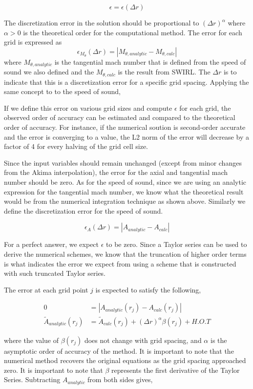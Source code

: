 \documentclass[a4paper]{report}
\begin{document}
\[ \epsilon = \epsilon(\Delta r) \]

The discretization error in the solution should be proportional to 
$\left( \Delta r \right)^{\alpha}$ where $\alpha > 0$ is the theoretical order
for the computational method.  The error for each grid is expressed as 
\[ \epsilon_{M_{\theta}}(\Delta r) = |M_{\theta,analytic}-M_{\theta,calc}|\]
where $M_{\theta,analytic}$ is the tangential mach number that is defined from the
speed of sound we also defined and the $M_{\theta,calc}$ is the result from 
SWIRL. The $\Delta r$ is to indicate that this is a discretization error for a
specific grid spacing. Applying the same concept to to the speed of sound,

If we define this error on various grid sizes and compute $\epsilon$ for
each grid, the observed order of accuracy can be estimated and compared to
the theoretical order of accuracy. For instance, if the numerical soution
is second-order accurate and the error is converging to a value, the L2 norm of
the error will decrease by a factor of 4 for every halving of the grid cell 
size. 

Since the input variables should remain unchanged (except from minor changes 
from the Akima interpolation), the error for the axial and tangential mach 
number should be zero. As for the speed of sound, since we are using an analytic
expression for the tangential mach number, we know what the theoretical result
would be from the numerical integration technique as shown above. 
Similarly we define the discretization error for the speed of sound.

\[ \epsilon_{A}(\Delta r) = |A_{analytic}-A_{calc}|\]

For a perfect answer, we expect $\epsilon$ to be zero. Since a Taylor series can 
be used to derive the numerical schemes, we know that the truncation of higher
order terms is what indicates the error we expect from using a scheme that 
is constructed with such truncated Taylor series.

The error at each grid point $j$ is expected to satisfy the following,

\begin{align*}
    0 &= |A_{analytic}(r_j) - A_{calc}(r_j)| \\
    \widetilde{A}_{analytic}(r_j) &= \widetilde{A}_{calc}(r_j) +
    (\Delta r)^{\alpha} \beta(r_j)  + H.O.T
\end{align*}

where the value of $\beta(r_j)$ does not change with grid spacing, and 
$\alpha$ is the asymptotic order of accuracy of the method. It is important to
note that the numerical method recovers the original equations as the grid 
spacing approached zero.  It is important to note that $\beta$ represents the
first derivative of the Taylor Series.  Subtracting $A_{analytic}$ from both
sides gives,
\end{document}
